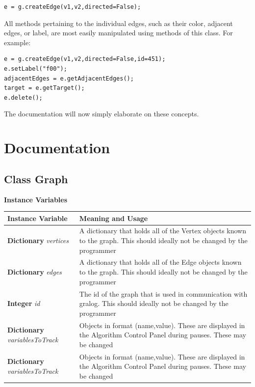 \documentclass{article}
\newlength\q
\begin{document}
\begin{lstlisting}
e = g.createEdge(v1,v2,directed=False);
\end{lstlisting}

All methods pertaining to the individual edges, such as their color, adjacent edges, or label, are most easily manipulated using methods of this class. For example:

\begin{lstlisting}
e = g.createEdge(v1,v2,directed=False,id=451);
e.setLabel("f00");
adjacentEdges = e.getAdjacentEdges();
target = e.getTarget();
e.delete();
\end{lstlisting}

The documentation will now simply elaborate on these concepts.

\section{Documentation}

\subsection{Class Graph}

\textbf{{\large Instance Variables}}


\begin{longtable}{p{\q}p{\q}}
Instance Variable & Meaning and Usage \\ \hline
\textbf{Dictionary} \textit{vertices} & A dictionary that holds all of the Vertex objects known to the graph. This should ideally not be changed by the programmer \\\hline
\textbf{Dictionary} \textit{edges} & A dictionary that holds all of the Edge objects known to the graph. This should ideally not be changed by the programmer \\\hline
\textbf{Integer} \textit{id} & The id of the graph that is used in communication with gralog. This should ideally not be changed by the programmer \\ \hline
\textbf{Dictionary} \textit{variablesToTrack} & Objects in format (name,value). These are displayed in the Algorithm Control Panel during pauses. These may be changed \\ \hline
\textbf{Dictionary} \textit{variablesToTrack} & Objects in format (name,value). These are displayed in the Algorithm Control Panel during pauses. These may be changed \\ \hline
\end{longtable}
\end{document}
